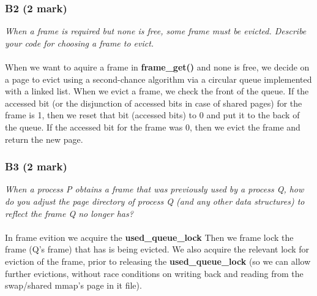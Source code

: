 \documentclass{report}
\newcommand{\question}[1]{\textit{#1} \ }
\newcommand{\fun}[1]{\textcolor{Emerald}{\textbf{#1}}}
\newcommand{\var}[1]{\textcolor{RoyalPurple}{\textbf{#1}}}
\begin{document}
			\subsubsection*{B2 (2 mark)}
				\question{When a frame is required but none is free, some frame must be evicted.
				Describe your code for choosing a frame to evict.}
				\\
				\\ When we want to aquire a frame in \fun{frame\_get()} and none is free,
				we decide on a page to evict using a second-chance algorithm via
				a circular queue implemented with a linked list. 
				When we evict a frame, we check the front of the queue. If the accessed bit (or the disjunction of
				accessed bits in case of shared pages) for the
				frame is 1, then we reset that bit (accessed bits) to 0 and put it to the back of the queue. If the
				accessed bit for the frame was 0, then we evict the frame and return the new page.
			
			\subsubsection*{B3 (2 mark)}
				\question{When a process P obtains a frame that was previously used by a 
				process Q, how do you adjust the page directory of process Q 
				(and any other data structures) to reflect the frame Q no longer has?}
				\\
				\\ In frame evition we acquire the \var{used\_queue\_lock}
				Then we frame lock the frame (Q's frame) that has is being evicted.
				We also acquire the relevant lock for eviction of the frame, prior to
				releasing the \var{used\_queue\_lock} (so we can allow further evictions,
				without race conditions on writing back and reading from the swap/shared
				mmap's page in it file).
				
\end{document}
